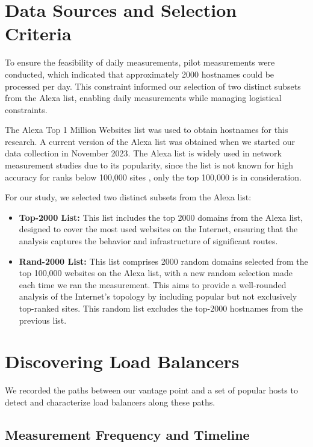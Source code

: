 \documentclass[12pt]{cwru_thesis}
\begin{document}
\section{Data Sources and Selection Criteria}

To ensure the feasibility of daily measurements, pilot measurements were conducted, which indicated that approximately 2000 hostnames could be processed per day. This constraint informed our selection of two distinct subsets from the Alexa list, enabling daily measurements while managing logistical constraints.

The Alexa Top 1 Million Websites list was used to obtain hostnames for this research. A current version of the Alexa list was obtained when we started our data collection in November 2023. The Alexa list is widely used in network measurement studies due to its popularity, since the list is not known for high accuracy for ranks below 100,000 sites  \cite{alexa2023top1m}, only the top 100,000 is in consideration.

For our study, we selected two distinct subsets from the Alexa list:
\begin{itemize}
    \item \textbf{Top-2000 List:} This list includes the top 2000 domains from the Alexa list, designed to cover the most used websites on the Internet, ensuring that the analysis captures the behavior and infrastructure of significant routes.
    \item \textbf{Rand-2000 List:} This list comprises 2000 random domains selected from the top 100,000 websites on the Alexa list, with a new random selection made each time we ran the measurement. This aims to provide a well-rounded analysis of the Internet's topology by including popular but not exclusively top-ranked sites. This random list excludes the top-2000 hostnames from the previous list.
\end{itemize}

\section{Discovering Load Balancers}

We recorded the paths between our vantage point and a set of popular hosts to detect and characterize load balancers along these paths. 

\subsection{Measurement Frequency and Timeline}
\label{subsec:freq}
\end{document}
